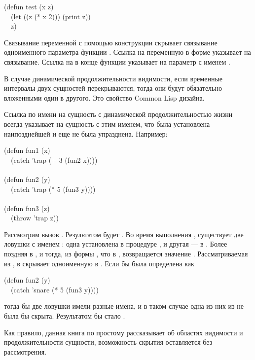 \begin{lisp}
(defun test (x z) \\
~~(let ((z (* x 2))) (print z)) \\
~~z)
\end{lisp}

Связывание переменной  с помощью конструкции  скрывает связывание
одноименного параметра функции . Ссылка на переменную  в форме
 указывает на  связывание. Ссылка на  в конце функции
указывает на параметр с именем .

В случае динамической продолжительности видимости, если временные интервалы двух
сущностей перекрываются, тогда они будут обязательно вложенными один в другого. Это
свойство Common Lisp дизайна.

Ссылка по имени на сущность с динамической продолжительностью жизни всегда
указывает на сущность с этим именем, что была установлена наипозднейшей и еще не
была упразднена.
Например:
\begin{lisp}
(defun fun1 (x) \\
~~(catch 'trap (+ 3 (fun2 x)))) \\
 \\
(defun fun2 (y) \\
~~(catch 'trap (* 5 (fun3 y)))) \\
 \\
(defun fun3 (z) \\
~~(throw 'trap z))
\end{lisp}

Рассмотрим вызов . Результатом будет . Во время выполнения
, существует две ловушки с именем : одна установлена в
процедуре , и другая --- в . Более поздняя в , и
тогда, из формы , что в , возвращается значение .
Рассматриваемая из ,  в  скрывает одноименную в
.
Если бы  была определена как
\begin{lisp}
(defun fun2 (y) \\
~~(catch 'snare (* 5 (fun3 y))))
\end{lisp}

тогда бы две ловушки имели разные имена, и в таком случае одна из них из
 не была бы скрыта. Результатом бы стало .

Как правило, данная книга по простому рассказывает об областях видимости и
продолжительности сущности, возможность скрытия оставляется без рассмотрения.

